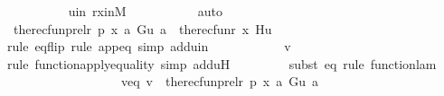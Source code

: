 \begin{isabellebody}
\ \ \ \ \ \ \ \ \isamarkupfalse%
\ uin\ rxinM\ \isanewline
\ \ \ \ \ \ \ \ \isamarkupfalse%
\ auto\isanewline
\isanewline
\ \ \ \ \ \ \isamarkupfalse%
\ {\isachardoublequoteopen}the{\isacharunderscore}{\kern0pt}recfun{\isacharparenleft}{\kern0pt}prel{\isacharparenleft}{\kern0pt}r{\isacharcomma}{\kern0pt}\ p{\isacharparenright}{\kern0pt}{\isacharcomma}{\kern0pt}\ {\isacharless}{\kern0pt}x{\isacharcomma}{\kern0pt}\ a{\isachargreater}{\kern0pt}{\isacharcomma}{\kern0pt}\ G{\isacharparenright}{\kern0pt}{\isacharbackquote}{\kern0pt}{\isacharless}{\kern0pt}u{\isacharcomma}{\kern0pt}\ a{\isachargreater}{\kern0pt}\ {\isacharequal}{\kern0pt}\ the{\isacharunderscore}{\kern0pt}recfun{\isacharparenleft}{\kern0pt}r{\isacharcomma}{\kern0pt}\ x{\isacharcomma}{\kern0pt}\ H{\isacharparenright}{\kern0pt}{\isacharbackquote}{\kern0pt}u{\isachardoublequoteclose}\ \isanewline
\ \ \ \ \ \ \ \ \isamarkupfalse%
{\isacharparenleft}{\kern0pt}rule\ eq{\isacharunderscore}{\kern0pt}flip{\isacharcomma}{\kern0pt}\ rule\ app{\isacharunderscore}{\kern0pt}eq{\isacharcomma}{\kern0pt}\ simp\ add{\isacharcolon}{\kern0pt}uin{\isacharparenright}{\kern0pt}\isanewline
\ \ \ \ \ \ \isamarkupfalse%
\ \isamarkupfalse%
\ {\isachardoublequoteopen}{\isachardot}{\kern0pt}{\isachardot}{\kern0pt}{\isachardot}{\kern0pt}\ {\isacharequal}{\kern0pt}\ v{\isachardoublequoteclose}\ \isanewline
\ \ \ \ \ \ \ \ \isamarkupfalse%
{\isacharparenleft}{\kern0pt}rule\ function{\isacharunderscore}{\kern0pt}apply{\isacharunderscore}{\kern0pt}equality{\isacharcomma}{\kern0pt}\ simp\ add{\isacharcolon}{\kern0pt}uH{\isacharparenright}{\kern0pt}\isanewline
\ \ \ \ \ \ \ \ \isamarkupfalse%
{\isacharparenleft}{\kern0pt}subst\ eq{}{\isacharcomma}{\kern0pt}\ rule\ function{\isacharunderscore}{\kern0pt}lam{\isacharparenright}{\kern0pt}\isanewline
\ \ \ \ \ \ \ \ \isamarkupfalse%
\isanewline
\ \ \ \ \ \ \isamarkupfalse%
\ \isamarkupfalse%
\ veq{\isacharcolon}{\kern0pt}\ {\isachardoublequoteopen}v\ {\isacharequal}{\kern0pt}\ the{\isacharunderscore}{\kern0pt}recfun{\isacharparenleft}{\kern0pt}prel{\isacharparenleft}{\kern0pt}r{\isacharcomma}{\kern0pt}\ p{\isacharparenright}{\kern0pt}{\isacharcomma}{\kern0pt}\ {\isacharless}{\kern0pt}x{\isacharcomma}{\kern0pt}\ a{\isachargreater}{\kern0pt}{\isacharcomma}{\kern0pt}\ G{\isacharparenright}{\kern0pt}{\isacharbackquote}{\kern0pt}{\isacharless}{\kern0pt}u{\isacharcomma}{\kern0pt}\ a{\isachargreater}{\kern0pt}{\isachardoublequoteclose}\ \isamarkupfalse%

\end{isabellebody}
